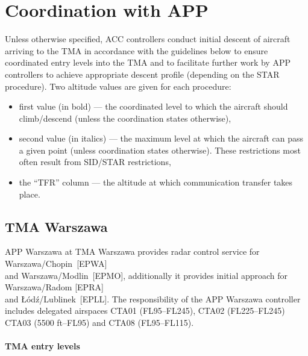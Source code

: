 
\chapter{Coordination with APP}\label{chap:acc:coordination}

Unless otherwise specified, ACC controllers conduct initial descent of aircraft
arriving to the TMA in accordance with the guidelines below to ensure
coordinated entry levels into the TMA and to facilitate further work by APP
controllers to achieve appropriate descent profile (depending on the STAR
procedure). Two altitude values are given for each procedure:
\begin{itemize}
	\item first value (in bold) --- the coordinated level to which the aircraft
	      should climb/descend (unless the coordination states otherwise),
	\item second value (in italics) --- the maximum level at which the aircraft can
	      pass a given point (unless coordination states otherwise). These restrictions
	      most often result from SID/STAR restrictions,
	\item the ``TFR'' column --- the altitude at which communication transfer takes
	      place.
\end{itemize}

\section{TMA Warszawa}\label{sec:acc:coordination:Warszawa}

APP Warszawa at TMA Warszawa provides radar control service for Warszawa/Chopin~[EPWA]\\and Warszawa/Modlin~[EPMO], additionally it provides initial approach for Warszawa/Radom [EPRA]\\and Łódź/Lublinek~[EPLL]. The responsibility of the APP Warszawa controller includes delegated airspaces CTA01 (FL95--FL245), CTA02 (FL225--FL245) CTA03 (5500 ft--FL95) and CTA08 (FL95--FL115).

\subsubsection{TMA entry levels}

\begin{table}[htbp]
	
	\caption{TMA Warszawa --- EPWA arrival entry levels}
	\label{tab:acc:coordination:warszawa:EPWA:entry}
\end{table}
\begin{table}[htbp]
	
	\caption{TMA Warszawa --- EPMO arrival entry levels}
	\label{tab:acc:coordination:warszawa:EPMO}
\end{table}
\begin{table}[htbp]
	
	\caption{TMA Warszawa --- EPRA arrival entry levels}
	\label{tab:acc:coordination:warszawa:EPRA}
\end{table}

